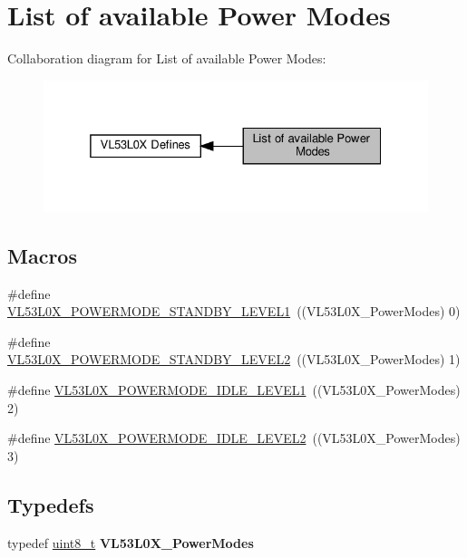 \hypertarget{group__VL53L0X__define__PowerModes__group}{}\section{List of available Power Modes}
\label{group__VL53L0X__define__PowerModes__group}
Collaboration diagram for List of available Power Modes\+:\nopagebreak
\begin{figure}[H]
\begin{center}
\leavevmode
\includegraphics[width=325pt]{group__VL53L0X__define__PowerModes__group}
\end{center}
\end{figure}
\subsection*{Macros}
\begin{DoxyCompactItemize}
\item 
\#define \hyperlink{group__VL53L0X__define__PowerModes__group_gae816ea89b667d4dd40341ad1ad0cbeb7}{V\+L53\+L0\+X\+\_\+\+P\+O\+W\+E\+R\+M\+O\+D\+E\+\_\+\+S\+T\+A\+N\+D\+B\+Y\+\_\+\+L\+E\+V\+E\+L1}~((V\+L53\+L0\+X\+\_\+\+Power\+Modes) 0)
\item 
\#define \hyperlink{group__VL53L0X__define__PowerModes__group_gafd2e4343268551ef26445ca31332e01c}{V\+L53\+L0\+X\+\_\+\+P\+O\+W\+E\+R\+M\+O\+D\+E\+\_\+\+S\+T\+A\+N\+D\+B\+Y\+\_\+\+L\+E\+V\+E\+L2}~((V\+L53\+L0\+X\+\_\+\+Power\+Modes) 1)
\item 
\#define \hyperlink{group__VL53L0X__define__PowerModes__group_gadc8d4ccde38324e2b8731eb3d4964d74}{V\+L53\+L0\+X\+\_\+\+P\+O\+W\+E\+R\+M\+O\+D\+E\+\_\+\+I\+D\+L\+E\+\_\+\+L\+E\+V\+E\+L1}~((V\+L53\+L0\+X\+\_\+\+Power\+Modes) 2)
\item 
\#define \hyperlink{group__VL53L0X__define__PowerModes__group_gabd79d2665e85cec3cd18a2faaa103134}{V\+L53\+L0\+X\+\_\+\+P\+O\+W\+E\+R\+M\+O\+D\+E\+\_\+\+I\+D\+L\+E\+\_\+\+L\+E\+V\+E\+L2}~((V\+L53\+L0\+X\+\_\+\+Power\+Modes) 3)
\end{DoxyCompactItemize}
\subsection*{Typedefs}
\begin{DoxyCompactItemize}
\item 
\mbox{\label{group__VL53L0X__define__PowerModes__group_ga1ddcb47e13a84eb97913d973ffeec2a2}} 
typedef \hyperlink{vl53l0x__types_8h_aba7bc1797add20fe3efdf37ced1182c5}{uint8\+\_\+t} {\bfseries V\+L53\+L0\+X\+\_\+\+Power\+Modes}
\end{DoxyCompactItemize}


